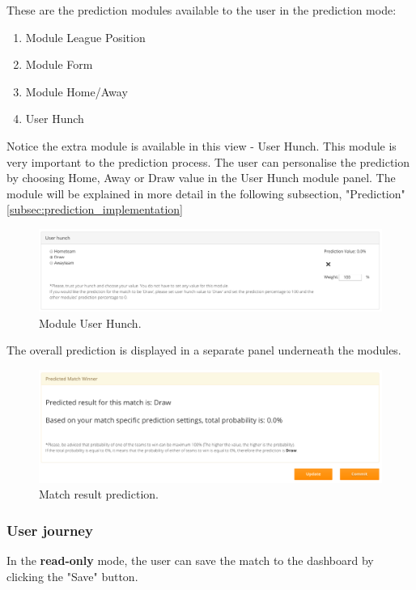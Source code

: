 These are the prediction modules available to the user in the prediction mode:

\begin{enumerate}
	\item Module League Position
	\item Module Form
	\item Module Home/Away
	\item User Hunch
\end{enumerate}

Notice the extra module is available in this view - User Hunch. This module is very important to the prediction process. The user can personalise the prediction by choosing Home, Away or Draw value in the User Hunch module panel. The module will be explained in more detail in the following subsection, "Prediction" \ref{subsec:prediction_implementation}

\begin{figure}[H]
	\begin{center}
		\includegraphics[width=.90\textwidth]{impl/images/userHunch}
		\caption{Module User Hunch.} \label{fig:using:userHunch}
	\end{center}
\end{figure}

The overall prediction is displayed in a separate panel underneath the modules.

\begin{figure}[H]
	\begin{center}
		\includegraphics[width=.90\textwidth]{impl/images/prediction}
		\caption{Match result prediction.} \label{fig:using:prediction}
	\end{center}
\end{figure}

\subsubsection*{User journey}
\label{subsec:upcomingmatchviewuserjourney}
In the \textbf{read-only} mode, the user can save the match to the dashboard by clicking the "Save" button.

